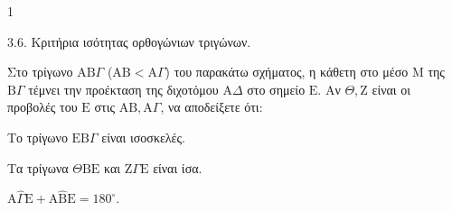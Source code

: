 \begin{ylh}{1}
    \item 3.6. Κριτήρια ισότητας ορθογώνιων τριγώνων.
\end{ylh}
Στο τρίγωνο $\mathrm{A}\mathrm{B}\Gamma$ ($\mathrm{A}\mathrm{B} < \mathrm{A}\Gamma$) του παρακάτω σχήματος, η κάθετη στο μέσο $\mathrm{M}$ της $\mathrm{B}\Gamma$ τέμνει την προέκταση της διχοτόμου $\mathrm{A}\Delta$ στο σημείο $\mathrm{E}$. Αν $\Theta, \mathrm{Z}$ είναι οι προβολές του $\mathrm{E}$ στις $\mathrm{A}\mathrm{B}, \mathrm{A}\Gamma$, να αποδείξετε ότι:
\begin{alist}
    \item Το τρίγωνο $\mathrm{E}\mathrm{B}\Gamma$ είναι ισοσκελές. 
    \item Τα τρίγωνα $\Theta\mathrm{B}\mathrm{E}$ και $\mathrm{Z}\Gamma\mathrm{E}$ είναι ίσα. 
    \item $\mathrm{A}\hat{\Gamma}\mathrm{E} + \mathrm{A}\hat{\mathrm{B}}\mathrm{E} = 180^\circ$. 
\end{alist}
